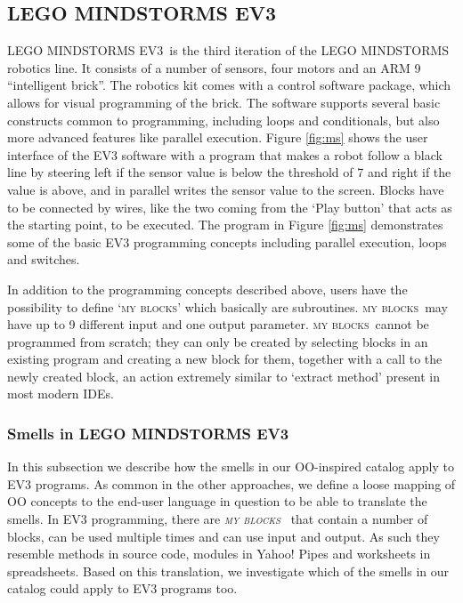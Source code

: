 \documentclass{sig-alternate}
\newcommand{\ms}{LEGO MINDSTORMS EV3}
\newcommand{\mbs}{\textsc{my blocks}}
\begin{document}
\subsection{\ms}
\ms~is the third iteration of the LEGO MINDSTORMS robotics line. It consists of a number of sensors, four motors and an ARM 9 ``intelligent brick''. The robotics kit comes with a control software package, which allows for visual programming of the brick. The software supports several basic constructs common to programming, including loops and conditionals, but also more advanced features like parallel execution. Figure \ref{fig:ms} shows the user interface of the EV3 software with a program that makes a robot follow a black line by steering left if the sensor value is below the threshold of 7 and right if the value is above, and in parallel writes the sensor value to the screen. Blocks have to be connected by wires, like the two coming from the `Play button' that acts as the starting point, to be executed. The program in Figure \ref{fig:ms} demonstrates some of the basic EV3 programming concepts including parallel execution, loops and switches.

In addition to the programming concepts described above, users have the possibility to define `\mbs' which basically are subroutines. \mbs~may have up to 9 different input and one output parameter. \mbs~cannot be programmed from scratch; they can only be created by selecting blocks in an existing program and creating a new block for them, together with a call to the newly created block, an action extremely similar to `extract method' present in most modern IDEs. 

\subsubsection{Smells  in \ms}
In this subsection we describe how the smells in our OO-inspired catalog apply to EV3 programs. As common in the other approaches, we define a loose mapping of OO concepts to the end-user language in question to be able to translate the smells. In EV3 programming, there are  \emph{\mbs~} that contain a number of blocks, can be used multiple times and can use input and output. As such they resemble methods in source code, modules in Yahoo! Pipes and worksheets in spreadsheets. Based on this translation, we investigate which of the smells in our catalog could apply to EV3 programs too. 
\end{document}
